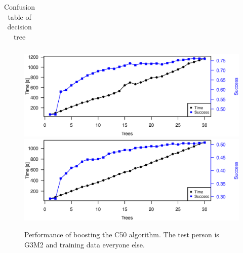 \begin{table}[H]
    \centering
    \begin{subtable}{0.005\textwidth}
    \end{subtable}
    \begin{subtable}{0.8\textwidth}
        \centering
    \end{subtable}

    \begin{subtable}{0.005\textwidth}
        \flushright
    \end{subtable}
    \begin{subtable}{0.8\textwidth}
        \begin{subtable}{\textwidth}
            \centering
            \begin{tabular}{*{11}{c}}
                
            \end{tabular}
            \caption{Confusion table of decision tree}
            \label{tb:tree_confus}
        \end{subtable}
    \end{subtable}
\end{table}

\begin{figure}[h]
\includegraphics[width = \textwidth]{graphics/tree_timing}
\includegraphics[width = \textwidth]{graphics/tree_timing_entropy}
\caption{Performance of boosting the C50 algorithm. The test person is G3M2 and training data everyone else.}
\label{fig:tree_timing}
\end{figure}

